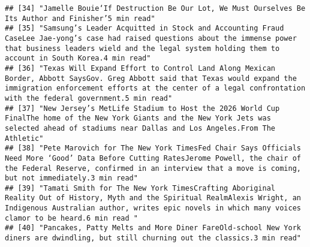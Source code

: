 \documentclass[
]{article}
\begin{document}
\begin{verbatim}
## [34] "Jamelle Bouie‘If Destruction Be Our Lot, We Must Ourselves Be Its Author and Finisher’5 min read"                                                                                                                                                                                                                                                                                                                     
## [35] "Samsung’s Leader Acquitted in Stock and Accounting Fraud CaseLee Jae-yong’s case had raised questions about the immense power that business leaders wield and the legal system holding them to account in South Korea.4 min read"                                                                                                                                                                                     
## [36] "Texas Will Expand Effort to Control Land Along Mexican Border, Abbott SaysGov. Greg Abbott said that Texas would expand the immigration enforcement efforts at the center of a legal confrontation with the federal government.5 min read"                                                                                                                                                                            
## [37] "New Jersey’s MetLife Stadium to Host the 2026 World Cup FinalThe home of the New York Giants and the New York Jets was selected ahead of stadiums near Dallas and Los Angeles.From The Athletic"                                                                                                                                                                                                                      
## [38] "Pete Marovich for The New York TimesFed Chair Says Officials Need More ‘Good’ Data Before Cutting RatesJerome Powell, the chair of the Federal Reserve, confirmed in an interview that a move is coming, but not immediately.3 min read"                                                                                                                                                                              
## [39] "Tamati Smith for The New York TimesCrafting Aboriginal Reality Out of History, Myth and the Spiritual RealmAlexis Wright, an Indigenous Australian author, writes epic novels in which many voices clamor to be heard.6 min read "                                                                                                                                                                                    
## [40] "Pancakes, Patty Melts and More Diner FareOld-school New York diners are dwindling, but still churning out the classics.3 min read"                                                                                                                                                                                                                                                                                    

\end{verbatim}
\end{document}
